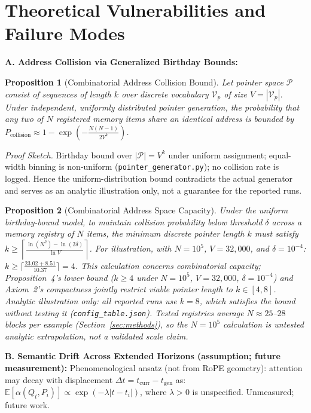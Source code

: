 \documentclass[conference]{IEEEtran}
\newtheorem{proposition}{Proposition}
\begin{document}
{\section{Theoretical Vulnerabilities and Failure Modes}

\noindent\textbf{A. Address Collision via Generalized Birthday Bounds:}
\begin{proposition}[Combinatorial Address Collision Bound]\label{prop:collision}
Let pointer space $\mathcal{P}$ consist of sequences of length $k$ over discrete vocabulary $\mathcal{V}_p$ of size $V = |\mathcal{V}_p|$. Under independent, uniformly distributed pointer generation, the probability that any two of $N$ registered memory items share an identical address is bounded by $P_{\text{collision}} \approx 1 - \exp\left(-\frac{N(N-1)}{2 V^k}\right)$.
\end{proposition}

\textit{Proof Sketch.} Birthday bound over $|\mathcal{P}|=V^k$ under uniform assignment; equal-width binning is non-uniform (\texttt{pointer\_generator.py}); no collision rate is logged. Hence the uniform-distribution bound contradicts the actual generator and serves as an analytic illustration only, not a guarantee for the reported runs.

\begin{proposition}[Combinatorial Address Space Capacity]\label{prop:capacity}
Under the uniform birthday-bound model, to maintain collision probability below threshold $\delta$ across a memory registry of $N$ items, the minimum discrete pointer length $k$ must satisfy $k \ge \left\lceil \frac{\ln(N^2) - \ln(2 \delta)}{\ln V} \right\rceil$.
For illustration, with $N = 10^5$, $V = 32{,}000$, and $\delta = 10^{-4}$: $k \ge \lceil \frac{23.02 + 8.51}{10.37} \rceil = 4$.
This calculation concerns combinatorial capacity; Proposition~4's lower bound ($k \ge 4$ under $N=10^5$, $V=32{,}000$, $\delta=10^{-4}$) and Axiom~2's compactness jointly restrict viable pointer length to $k \in [4, 8]$. Analytic illustration only: all reported runs use $k=8$, which satisfies the bound without testing it (\texttt{config\_table.json}). Tested registries average $N{\approx}25$--$28$ blocks per example (Section~\ref{sec:methods}), so the $N{=}10^5$ calculation is untested analytic extrapolation, not a validated scale claim.
\end{proposition}

\noindent\textbf{B. Semantic Drift Across Extended Horizons (assumption; future measurement):}
Phenomenological ansatz (not from RoPE geometry): attention may decay with displacement $\Delta t = t_{\text{curr}} - t_{\text{gen}}$ as: $\mathbb{E}[\alpha(Q_t, P_i)] \propto \exp(-\lambda |t - t_i|)$, where $\lambda > 0$ is unspecified. Unmeasured; future work.

}
\end{document}

